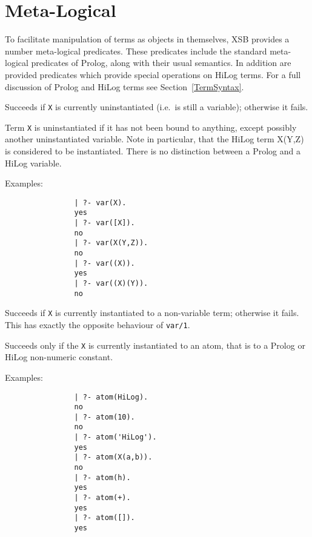 \section{Meta-Logical}\label{MetaLogical}

To facilitate manipulation of terms as objects in themselves,
XSB provides a number meta-logical predicates.  These
predicates include the standard meta-logical predicates of Prolog,
along with their usual semantics.  In addition are provided predicates
which provide special operations on HiLog terms.  For a full
discussion of Prolog and HiLog terms see Section~\ref{TermSyntax}.

\begin{description}
    Succeeds if {\tt X} is currently uninstantiated (i.e.\ is still a 
    variable); otherwise it fails.  

    Term {\tt X} is uninstantiated if it has not been bound to anything, 
    except possibly another uninstantiated variable. Note in particular,
    that the HiLog term X(Y,Z) is considered to be instantiated.  There 
    is no distinction between a Prolog and a HiLog variable.

    Examples:
    {\footnotesize
     \begin{verbatim}
                | ?- var(X).
                yes
                | ?- var([X]).
                no
                | ?- var(X(Y,Z)).
                no
                | ?- var((X)).
                yes
                | ?- var((X)(Y)).
                no
     \end{verbatim}}


    Succeeds if {\tt X} is currently instantiated to a non-variable term;
    otherwise it fails. This has exactly the opposite behaviour of 
    {\tt var/1}\@.

    Succeeds only if the {\tt X} is currently instantiated to an atom, that
    is to a Prolog or HiLog non-numeric constant.

    Examples:
    {\footnotesize
     \begin{verbatim}
                | ?- atom(HiLog).
                no
                | ?- atom(10).
                no
                | ?- atom('HiLog').
                yes
                | ?- atom(X(a,b)).
                no
                | ?- atom(h).
                yes
                | ?- atom(+).
                yes
                | ?- atom([]).
                yes
     \end{verbatim}}


\end{description}
